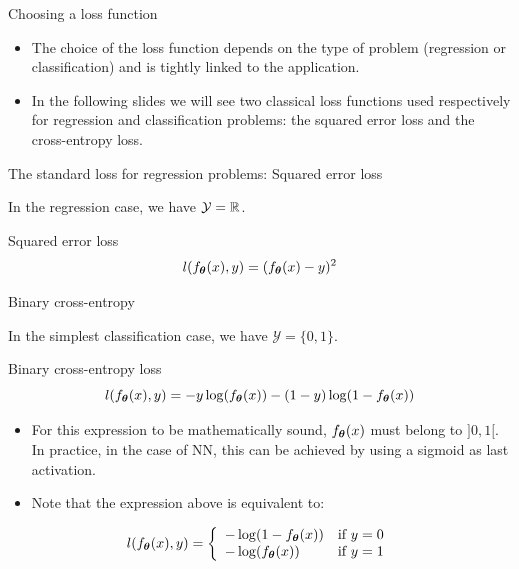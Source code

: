 \documentclass[xcolor=pdftex,dvipsnames,table,mathserif]{beamer}
\begin{document}
\begin{frame}{Choosing a loss function}

\begin{itemize}
\item The choice of the loss function depends on the type of problem (regression or classification) and is tightly linked to the application.
\item   In the following slides we will see two classical loss functions used respectively for regression and classification problems: the squared error loss and the cross-entropy loss.
\end{itemize}

\end{frame}


\begin{frame}{The standard loss for regression problems: Squared error loss}

In the regression case, we have $\mathcal{Y} = \mathbb{R}$.

\begin{block}{Squared error loss}
    \[
    l(f_{\boldsymbol{\theta}}(x), y) = (f_{\boldsymbol{\theta}}(x) - y)^2
    \]

\end{block}

\end{frame}


\begin{frame}{Binary cross-entropy}

  In the simplest classification case, we have $\mathcal{Y}=\{0, 1\}$.

  \begin{block}{Binary cross-entropy loss}
    \[
    l(f_{\boldsymbol{\theta}}(x), y) = - y \log(f_{\boldsymbol{\theta}}(x)) - (1 - y) \log(1 - f_{\boldsymbol{\theta}}(x))
    \]
  \end{block}

\begin{itemize}
\item   For this expression to be mathematically sound, $f_{\boldsymbol{\theta}}(x)$ must belong to $]0, 1[$. In practice, in the case of NN, this can be achieved by using a sigmoid as last activation.
  \item Note that the expression above is equivalent to:
\end{itemize}

$$
l(f_{\boldsymbol{\theta}}(x), y) = \left\{
    \begin{array}{ll}
        - \log(1 - f_{\boldsymbol{\theta}}(x)) & \mbox{if } y=0 \\
        - \log(f_{\boldsymbol{\theta}}(x)) & \mbox{if } y=1
    \end{array}
\right.
$$


\end{frame}
\end{document}

